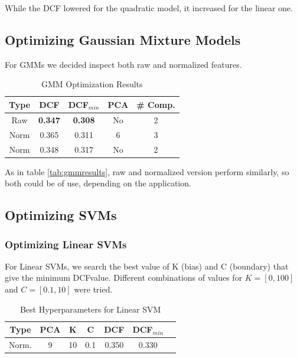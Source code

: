 \documentclass[hidelinks, 12pt, twocolumn]{article}
\begin{document}
While the DCF lowered for the quadratic model, it increased for the linear one.

\subsection{Optimizing Gaussian Mixture Models}

For GMMs we decided inspect both raw and normalized features.

\begin{table}[H] 
    \centering
    \begin{tabular}{||c|c|c|c|c||}
        \hline
        Type & DCF & DCF$_{min}$ & PCA & \# Comp. \\
        \hline
        \hline
        Raw  & {\bf 0.347} & {\bf 0.308} & No & 2 \\
        Norm & 0.365 & 0.311 & 6  & 3 \\
        Norm & 0.348 & 0.317 & No & 2 \\
        \hline
    \end{tabular}
    \caption{GMM Optimization Results}
    \label{tab:gmmoptimization}
\end{table}

As in table \ref{tab:gmmresults}, raw and normalized version perform similarly,
so both could be of use, depending on the application.

\subsection{Optimizing SVMs}

\subsubsection{Optimizing Linear SVMs}

For Linear SVMs, we search the best value of K (bias) and C (boundary) that give the minimum DCFvalue.
Different combinations of values for $K = \left[0,100\right]$ and $C = \left[0.1, 10\right]$ were tried.

\begin{table}[H] 
    \centering
    \small
    \begin{tabular}{||c|c|c|c|c|c|c||}
        \hline
        Type & PCA & K & C & DCF & DCF$_{min}$ \\
        \hline
        \hline
        Norm. & 9 & 10 & 0.1 & 0.350 & 0.330 \\
        \hline
    \end{tabular}
    \caption{Best Hyperparameters for Linear SVM}
\end{table}
\end{document}
